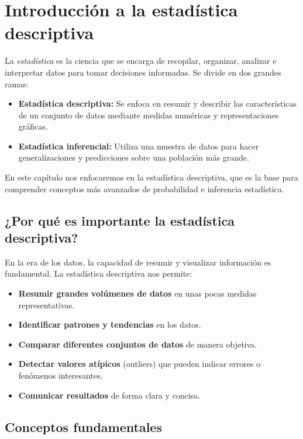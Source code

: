 \section{Introducción a la estadística descriptiva}

La \emph{estadística} es la ciencia que se encarga de recopilar, organizar, analizar e interpretar datos para tomar decisiones informadas. Se divide en dos grandes ramas:

\begin{itemize}
	\item \textbf{Estadística descriptiva:} Se enfoca en resumir y describir las características de un conjunto de datos mediante medidas numéricas y representaciones gráficas.
	\item \textbf{Estadística inferencial:} Utiliza una muestra de datos para hacer generalizaciones y predicciones sobre una población más grande.
\end{itemize}

En este capítulo nos enfocaremos en la estadística descriptiva, que es la base para comprender conceptos más avanzados de probabilidad e inferencia estadística.

\subsection{¿Por qué es importante la estadística descriptiva?}

En la era de los datos, la capacidad de resumir y visualizar información es fundamental. La estadística descriptiva nos permite:

\begin{itemize}
	\item \textbf{Resumir grandes volúmenes de datos} en unas pocas medidas representativas.
	\item \textbf{Identificar patrones y tendencias} en los datos.
	\item \textbf{Comparar diferentes conjuntos de datos} de manera objetiva.
	\item \textbf{Detectar valores atípicos} (outliers) que pueden indicar errores o fenómenos interesantes.
	\item \textbf{Comunicar resultados} de forma clara y concisa.
\end{itemize}

\subsection{Conceptos fundamentales}

